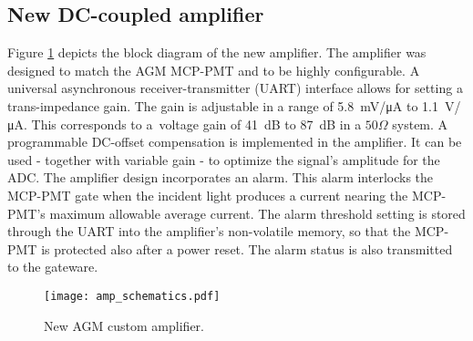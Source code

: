 \subsection{New DC-coupled amplifier}

Figure \ref{fig:amp_schematics} depicts the block diagram of the new amplifier.
%
The amplifier was designed to match the AGM MCP-PMT and to be  highly configurable.
%
A universal asynchronous receiver-transmitter (UART) interface allows for setting a trans-impedance gain.
%
The gain is adjustable in a range of \SI{5.8}{mV/\micro A} to \SI{1.1}{V/\micro A}.
%
This corresponds to a~voltage gain of \SI{41}{dB} to \SI{87}{dB} in a $50\Omega$ system.
%
A programmable DC-offset compensation is implemented in the amplifier.
%
It can be used - together with variable gain - to optimize the signal's amplitude for the ADC.
%
The amplifier design incorporates an alarm. This alarm interlocks the MCP-PMT gate when the incident light produces a current nearing the MCP-PMT's maximum allowable average current.
%
The alarm threshold setting is stored through the UART into the amplifier's non-volatile memory, so that 
the MCP-PMT is protected also after a power reset. %
%
The alarm status is also transmitted to the gateware.
%
\begin{figure}[!tbh]
    \centering
    \texttt{[image: amp\_schematics.pdf]}
    \caption{New AGM custom amplifier.}
    \label{fig:amp_schematics}
\end{figure}
%

